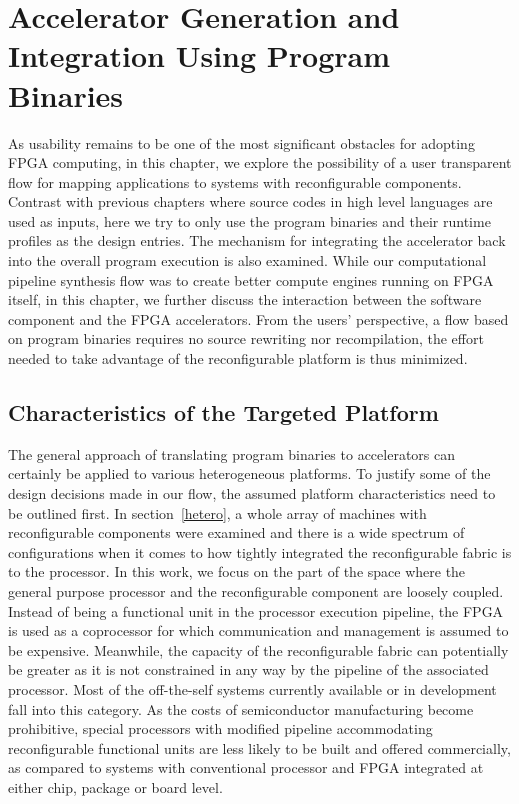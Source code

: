 \chapter{Accelerator Generation and Integration Using Program Binaries}
\label{instrumentChap}
As usability remains to be one of the most significant obstacles for adopting FPGA computing, in this chapter, we explore the possibility of a user
transparent flow for mapping applications to systems with reconfigurable components.
Contrast with previous chapters where source codes in high level
languages are used as inputs, here we try to only use the program binaries and their runtime profiles as the design entries. 
The mechanism for integrating the accelerator back into the overall program execution is also examined. While our computational pipeline synthesis flow was to create better compute engines running on FPGA itself, in this chapter, we
further discuss the interaction between the software component and the FPGA accelerators. From the users' perspective, a flow based on
program binaries requires no source rewriting
nor recompilation, the effort needed to take advantage
of the reconfigurable platform is thus minimized. 

\section{Characteristics of the Targeted Platform}
\label{chartarg}
The general approach of translating program binaries to accelerators can certainly be applied to various heterogeneous platforms. To justify some of the design decisions made in our flow, the assumed platform 
characteristics need to be outlined first. 
In section~\ref{hetero}, a whole array of machines with reconfigurable
components were examined and there is a wide spectrum of configurations
when it comes to how tightly integrated the reconfigurable fabric is to
the processor. 
In this work, we focus on the part of the space where the general purpose processor and the reconfigurable component are loosely coupled.
Instead of being a functional unit in the processor
execution pipeline, the FPGA is used as a coprocessor for which
communication and management is assumed to be expensive.
Meanwhile, the capacity of the reconfigurable fabric can potentially be greater as it is not constrained in any way by the pipeline of the associated processor. 
Most of the off-the-self systems currently available or in development~\cite{xeonwithfpga} fall into this category. As the
costs of semiconductor manufacturing become prohibitive, 
special processors with modified pipeline accommodating
reconfigurable functional units are less likely to be built
and offered commercially, as compared to systems with conventional
processor and FPGA integrated at either chip, package or board level.

